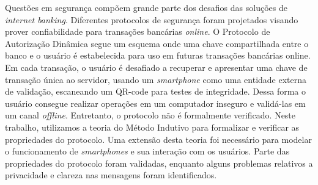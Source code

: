 Questões em segurança compõem grande parte dos desafios das soluções de \textit{internet banking}. Diferentes protocolos de segurança foram projetados visando prover confiabilidade para transações bancárias \textit{online}. O Protocolo de Autorização Dinâmica segue um esquema onde uma chave compartilhada entre o banco e o usuário é estabelecida para uso em futuras transações bancárias online. Em cada transação, o usuário é desafiado a recuperar e apresentar uma chave de transação única ao servidor, usando um \textit{smartphone} como uma entidade externa de validação, escaneando um QR-code para testes de integridade. Dessa forma o usuário consegue realizar operações em um computador inseguro e validá-las em um canal \textit{offline}. Entretanto, o protocolo não é formalmente verificado. Neste trabalho, utilizamos a teoria do Método Indutivo para formalizar e verificar as propriedades do protocolo. Uma extensão desta teoria foi necessário para modelar o funcionamento de \textit{smartphones} e sua interação com os usuários. Parte das propriedades do protocolo foram validadas, enquanto alguns problemas relativos a privacidade e clareza nas mensagens foram identificados.